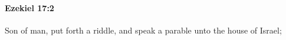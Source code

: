 
		\paragraph{Ezekiel 17:2} %
			\label{EZEKIEL-17-2}

			Son of man, put forth a riddle, and speak a parable unto the house of Israel;


